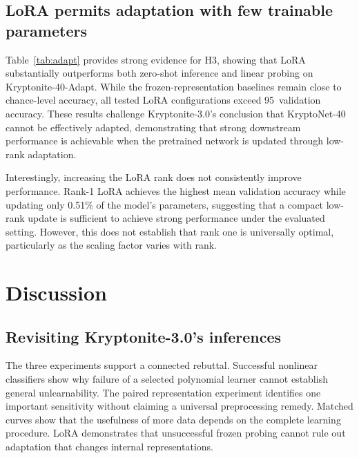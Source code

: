 \documentclass{article}
\begin{document}
\subsection{LoRA permits adaptation with few trainable parameters}
Table~\ref{tab:adapt} provides strong evidence for H3, showing that LoRA substantially outperforms both zero-shot inference and linear probing on Kryptonite-40-Adapt. While the frozen-representation baselines remain close to chance-level accuracy, all tested LoRA configurations exceed 95\ validation accuracy. These results challenge Kryptonite-3.0's conclusion that KryptoNet-40 cannot be effectively adapted, demonstrating that strong downstream performance is achievable when the pretrained network is updated through low-rank adaptation.

\begin{table}[t]
\centering

\caption{K40-Adapt validation accuracy on 800 examples. Trained methods report mean $\pm$ sample seed standard deviation (percentage points); zero-shot is deterministic.}
\label{tab:adapt}
\end{table}

Interestingly, increasing the LoRA rank does not consistently improve performance. Rank-1 LoRA achieves the highest mean validation accuracy while updating only 0.51\% of the model's parameters, suggesting that a compact low-rank update is sufficient to achieve strong performance under the evaluated setting. However, this does not establish that rank one is universally optimal, particularly as the scaling factor varies with rank.

\section{Discussion}
\subsection{Revisiting Kryptonite-3.0's inferences}
The three experiments support a connected rebuttal. Successful nonlinear classifiers show why failure of a selected polynomial learner cannot establish general unlearnability. The paired representation experiment identifies one important sensitivity without claiming a universal preprocessing remedy. Matched curves show that the usefulness of more data depends on the complete learning procedure. LoRA demonstrates that unsuccessful frozen probing cannot rule out adaptation that changes internal representations.
\end{document}
